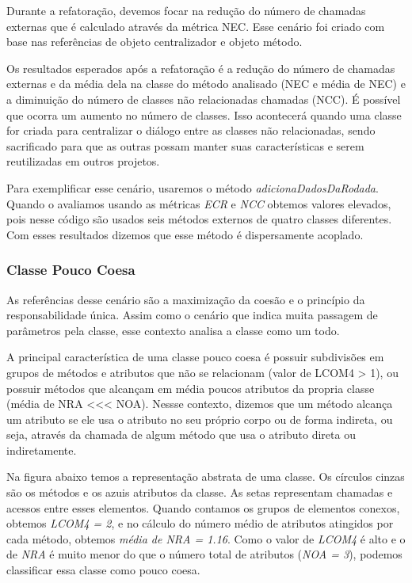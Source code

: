 	Durante a refatoração, devemos focar na redução do número de chamadas externas que é calculado através da métrica NEC. Esse cenário foi criado com base nas referências de objeto centralizador e objeto método.
	
	Os resultados esperados após a refatoração é a redução do número de chamadas externas e da média dela na classe do método analisado (NEC e média de NEC) e a diminuição do número de classes não relacionadas chamadas (NCC). É possível que ocorra um aumento no número de classes. Isso acontecerá quando uma classe for criada para centralizar o diálogo entre as classes não relacionadas, sendo sacrificado para que as outras possam manter suas características e serem reutilizadas em outros projetos. 
	  
	Para exemplificar esse cenário, usaremos o método \textit{adicionaDadosDaRodada}. Quando o avaliamos usando as métricas \textit{ECR} e \textit{NCC} obtemos valores elevados, pois nesse código são usados seis métodos externos de quatro classes diferentes. Com esses resultados dizemos que esse método é dispersamente acoplado.
  
                                      
  

\subsubsection{Classe Pouco Coesa}

	As referências desse cenário são a maximização da coesão e o princípio da responsabilidade única. Assim como o cenário que indica muita passagem de parâmetros pela classe, esse contexto analisa a classe como um todo.
	
	A principal característica de uma classe pouco coesa é possuir subdivisões em grupos de métodos e atributos que não se relacionam (valor de LCOM4 > 1), ou possuir métodos que alcançam em média poucos atributos da propria classe (média de NRA <<< NOA). Nessse contexto, dizemos que um método alcança um atributo se ele usa o atributo no seu próprio corpo ou de forma indireta, ou seja, através da chamada de algum método que usa o atributo direta ou indiretamente.
	   
	Na figura abaixo temos a representação abstrata de uma classe. Os círculos cinzas são os métodos e os azuis atributos da classe. As setas representam chamadas e acessos entre esses elementos. Quando contamos os grupos de elementos conexos, obtemos \textit{LCOM4 = 2}, e no cálculo do número médio de atributos atingidos por cada método, obtemos \textit{média de NRA = 1.16}. Como o valor de \textit{LCOM4} é alto e o de \textit{NRA} é muito menor do que o número total de atributos (\textit{NOA = 3}), podemos classificar essa classe como pouco coesa.
		
